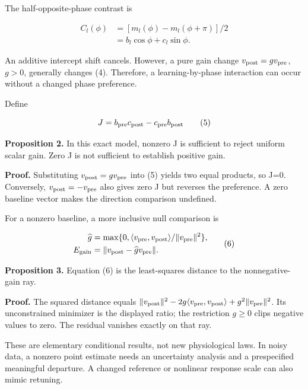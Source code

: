 \documentclass[
  american,
  11pt,
  letterpaper,
]{article}
\begin{document}
The half-opposite-phase contrast is

\begin{equation}
\begin{aligned}C_l(\phi)&=[m_l(\phi)-m_l(\phi+\pi)]/2\\ &=b_l\cos\phi+c_l\sin\phi.\end{aligned}\tag{4}
\end{equation}

An additive intercept shift cancels. However, a pure gain change \(v_{\rm post}=g v_{\rm pre}\), \(g>0\), generally changes (4). Therefore, a learning-by-phase interaction can occur without a changed phase preference.

Define

\begin{equation}
J=b_{\rm pre}c_{\rm post}-c_{\rm pre}b_{\rm post}\tag{5}
\end{equation}

\textbf{Proposition 2.} In this exact model, nonzero J is sufficient to reject uniform scalar gain. Zero J is not sufficient to establish positive gain.

\textbf{Proof.} Substituting \(v_{\rm post}=g v_{\rm pre}\) into (5) yields two equal products, so J=0. Conversely, \(v_{\rm post}=-v_{\rm pre}\) also gives zero J but reverses the preference. A zero baseline vector makes the direction comparison undefined.

For a nonzero baseline, a more inclusive null comparison is

\begin{equation}
\begin{aligned}\widehat g&=\max\{0,\langle v_{\rm pre},v_{\rm post}\rangle/\|v_{\rm pre}\|^2\},\\ E_{\rm gain}&=\|v_{\rm post}-\widehat g v_{\rm pre}\|.\end{aligned}\tag{6}
\end{equation}

\textbf{Proposition 3.} Equation (6) is the least-squares distance to the nonnegative-gain ray.

\textbf{Proof.} The squared distance equals \(\|v_{\rm post}\|^2-2g\langle v_{\rm pre},v_{\rm post}\rangle+g^2\|v_{\rm pre}\|^2\). Its unconstrained minimizer is the displayed ratio; the restriction \(g\geq0\) clips negative values to zero. The residual vanishes exactly on that ray.

These are elementary conditional results, not new physiological laws. In noisy data, a nonzero point estimate needs an uncertainty analysis and a prespecified meaningful departure. A changed reference or nonlinear response scale can also mimic retuning.
\end{document}

